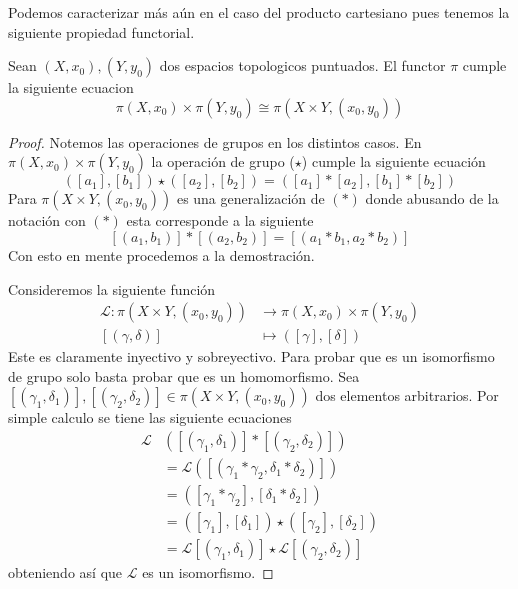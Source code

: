 Podemos caracterizar más aún en el caso del producto cartesiano pues
tenemos la siguiente propiedad functorial.

\begin{teorema}
  Sean \((X, x_0), (Y,y_0)\) dos espacios topologicos puntuados. El
  functor \(\pi\) cumple la siguiente ecuacion
  \[ \pi (X, x_0) \times \pi (Y, y_0) \cong \pi (X \times Y, (x_0, y_0)) \]
\end{teorema}
\begin{proof}
  Notemos las operaciones de grupos en los distintos casos. En \(\pi(X,
  x_0) \times \pi (Y, y_0)\) la operación de grupo (\(\star\)) cumple la
  siguiente ecuación
  \[ ([a_1],[b_1]) \star ([a_2], [b_2]) = ([a_1] * [a_2] , [b_1] *
    [b_2]) \]
  Para \(\pi (X \times Y , (x_0, y_0))\) es una generalización de
  \((*)\) donde abusando de la notación con \((*)\) esta corresponde a
  la siguiente
  \[ [(a_1, b_1)] * [(a_2, b_2)] = [(a_1 * b_1 , a_2 * b_2)] \]
  Con esto en mente procedemos a la demostración.

  Consideremos la siguiente función
  \begin{align*}
    \mathcal L : \pi (X \times Y , (x_0, y_0)) &\longrightarrow \pi (X,
        x_0) \times \pi (Y, y_0) \\
    [(\gamma, \delta)] &\longmapsto ([\gamma], [\delta])
  \end{align*}
  Este es claramente inyectivo y sobreyectivo. Para probar que es un
  isomorfismo de grupo solo basta probar que es un homomorfismo. Sea
  \([(\gamma_1, \delta_1)], [(\gamma_2, \delta_2)] \in \pi (X \times Y ,
  (x_0, y_0))\) dos elementos arbitrarios. Por simple calculo se tiene
  las siguiente ecuaciones
  \begin{align*}
    \mathcal L &\left( [(\gamma_1, \delta_1)] * [(\gamma_2, \delta_2)] \right) \\
    &= \mathcal L \left( [(\gamma_1 * \gamma_2 , \delta_1 * \delta_2)] \right) \\
    &= ([\gamma_1 * \gamma_2] , [\delta_1 * \delta_2]) \\
    &= ([\gamma_1] , [\delta_1]) \star ([\gamma_2] , [\delta_2]) \\
    &= \mathcal L [(\gamma_1 , \delta_1)] \star \mathcal L [(\gamma_2 ,
      \delta_2)]
  \end{align*}
  obteniendo así que \(\mathcal L\) es un isomorfismo.
\end{proof}

